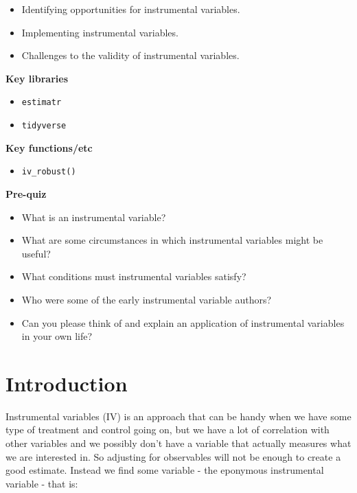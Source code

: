 \documentclass[
]{book}
\providecommand{\tightlist}{%
  \setlength{\itemsep}{0pt}\setlength{\parskip}{0pt}}
\begin{document}
\begin{itemize}
\tightlist
\item
  Identifying opportunities for instrumental variables.
\item
  Implementing instrumental variables.
\item
  Challenges to the validity of instrumental variables.
\end{itemize}

\textbf{Key libraries}

\begin{itemize}
\tightlist
\item
  \texttt{estimatr}
\item
  \texttt{tidyverse}
\end{itemize}

\textbf{Key functions/etc}

\begin{itemize}
\tightlist
\item
  \texttt{iv\_robust()}
\end{itemize}

\textbf{Pre-quiz}

\begin{itemize}
\tightlist
\item
  What is an instrumental variable?
\item
  What are some circumstances in which instrumental variables might be useful?
\item
  What conditions must instrumental variables satisfy?
\item
  Who were some of the early instrumental variable authors?
\item
  Can you please think of and explain an application of instrumental variables in your own life?
\end{itemize}

\hypertarget{introduction-22}{%
\section{Introduction}\label{introduction-22}}

Instrumental variables (IV) is an approach that can be handy when we have some type of treatment and control going on, but we have a lot of correlation with other variables and we possibly don't have a variable that actually measures what we are interested in. So adjusting for observables will not be enough to create a good estimate. Instead we find some variable - the eponymous instrumental variable - that is:
\end{document}
